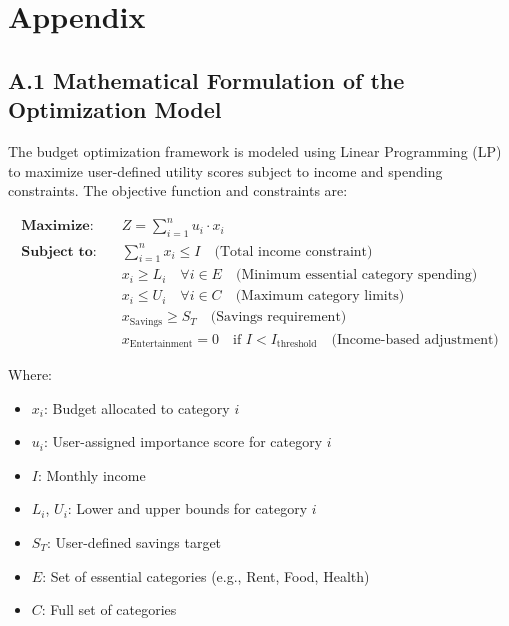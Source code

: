\documentclass{article}
\begin{document}



\appendix
\section*{Appendix}

\subsection*{A.1 Mathematical Formulation of the Optimization Model}

The budget optimization framework is modeled using Linear Programming (LP) to maximize user-defined utility scores subject to income and spending constraints. The objective function and constraints are:

\begin{align*}
    \textbf{Maximize:} \quad   & Z = \sum_{i=1}^{n} u_i \cdot x_i                                                                              \\
    \textbf{Subject to:} \quad & \sum_{i=1}^{n} x_i \leq I \quad \text{(Total income constraint)}                                              \\
                               & x_i \geq L_i \quad \forall i \in E \quad \text{(Minimum essential category spending)}                         \\
                               & x_i \leq U_i \quad \forall i \in C \quad \text{(Maximum category limits)}                                     \\
                               & x_{\text{Savings}} \geq S_T \quad \text{(Savings requirement)}                                                \\
                               & x_{\text{Entertainment}} = 0 \quad \text{if } I < I_{\text{threshold}} \quad \text{(Income-based adjustment)}
\end{align*}

Where:
\begin{itemize}
    \item $x_i$: Budget allocated to category $i$
    \item $u_i$: User-assigned importance score for category $i$
    \item $I$: Monthly income
    \item $L_i$, $U_i$: Lower and upper bounds for category $i$
    \item $S_T$: User-defined savings target
    \item $E$: Set of essential categories (e.g., Rent, Food, Health)
    \item $C$: Full set of categories
\end{itemize}
\end{document}

